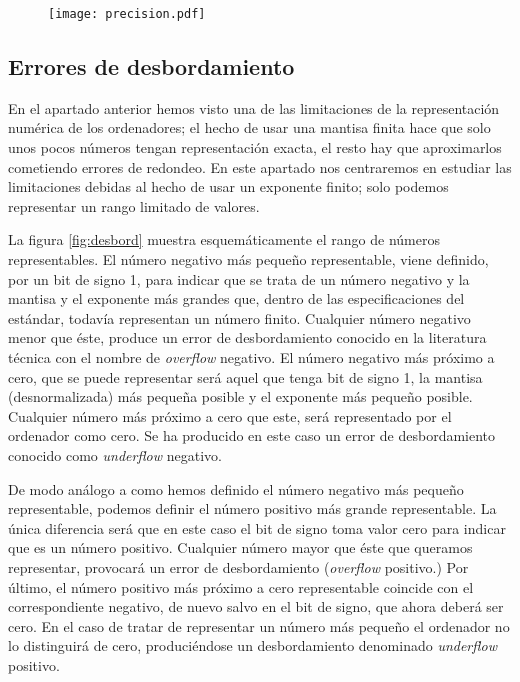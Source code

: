 \begin{figure}[h]
	\centering
		\texttt{[image: precision.pdf]}
	\label{fig:precision}
\end{figure}

\begin{paracol}{2}
\subsection{Errores de desbordamiento}
En el apartado anterior hemos visto una de las limitaciones de la representación numérica de los ordenadores; el hecho de usar una mantisa finita hace que solo unos pocos números tengan representación exacta, el resto hay que aproximarlos cometiendo errores de redondeo. En este apartado nos centraremos en estudiar las limitaciones debidas al hecho de usar un exponente finito; solo podemos representar un rango limitado de valores.

La figura \ref{fig:desbord} muestra esquemáticamente el rango de números representables. El número negativo más pequeño representable, viene definido, por un bit de signo 1, para indicar que se trata de un número negativo y la mantisa y el exponente más grandes que, dentro de las especificaciones del estándar, todavía representan un número finito. Cualquier número negativo menor que éste, produce un error de desbordamiento conocido en la literatura técnica con el nombre de \emph{overflow} negativo. El número negativo más próximo a cero, que se puede representar será aquel que tenga bit de signo 1, la mantisa (desnormalizada) más pequeña posible y el exponente más pequeño posible. Cualquier número más próximo a cero que este, será representado por el ordenador como cero. Se ha producido en este caso un error de desbordamiento conocido como \emph{underflow} negativo. 

De modo análogo a como hemos definido el número negativo más pequeño representable, podemos definir el número positivo más grande representable. La única diferencia será que en este caso el bit de signo toma valor cero para indicar que es un  número positivo. Cualquier número mayor que éste que queramos representar, provocará un error de desbordamiento (\emph{overflow} positivo.) Por último, el número positivo más próximo a cero representable coincide con el correspondiente negativo, de nuevo salvo en el bit de signo, que ahora deberá ser cero. En el caso de tratar de representar un número más pequeño el ordenador no lo distinguirá de cero, produciéndose un desbordamiento denominado \emph{underflow} positivo. 
\switchcolumn

\end{paracol}
